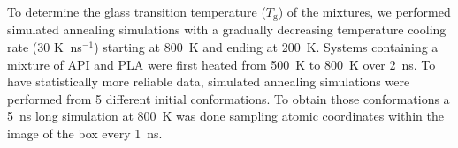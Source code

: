 To determine the glass transition temperature ($T_\mathrm{g}$) of the mixtures, we performed simulated annealing simulations with a gradually decreasing temperature cooling rate (30 K$\ $ ns$^{-1}$) starting at 800~K and ending at 200~K. Systems containing a mixture of API and PLA were first heated from 500~K to 800~K over 2~ns. To have statistically more reliable data, simulated annealing simulations were performed from 5 different initial conformations. To obtain those conformations a 5~ns long simulation at 800~K was done sampling atomic coordinates within the image of the box every 1~ns.  